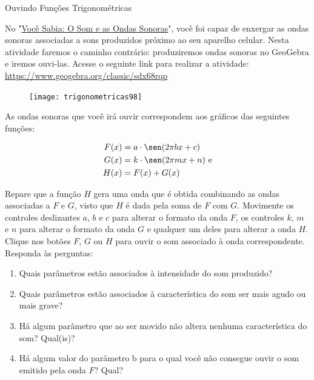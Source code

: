 \clearpage
\begin{task}{Ouvindo Funções Trigonométricas}
\label{trig-ativ20}

No "\hyperref[trig-knowledge1]{Você Sabia: O Som e as Ondas Sonoras}"{},
você foi capaz de enxergar as ondas sonoras associadas a sons produzidos próximo ao seu aparelho celular. Nesta atividade faremos o caminho contrário: produziremos ondas sonoras no GeoGebra e iremos ouvi-las. Acesse o seguinte link para realizar a atividade: \url{https://www.geogebra.org/classic/sdx68rqp}

\begin{figure}[H]
\centering

\texttt{[image: trigonometricas98]}
\end{figure}

As ondas sonoras que você irá ouvir correspondem aos gráficos das seguintes funções:

\begin{align*}
F(x) &= a\cdot\sen(2\pi bx+c)\\
G(x) &= k\cdot\sen(2\pi mx+n) \text{ e}\\
H(x) &= F(x) + G(x)
\end{align*}

Repare que a função $H$ gera uma onda que é obtida combinando as ondas associadas a $F$ e $G$, visto que $H$ é dada pela soma de $F$ com $G$. Movimente os controles deslizantes $a$, $b$ e $c$ para alterar o formato da onda $F$, os controles $k$, $m$ e $n$ para alterar o formato da onda $G$ e qualquer um deles para alterar a onda $H$. Clique nos botões $F$, $G$ ou $H$ para ouvir o som associado à onda correspondente. Responda às perguntas:

\begin{enumerate}
\item Quais parâmetros estão associados à intensidade do som produzido?
\item Quais parâmetros estão associados à característica do som ser mais agudo ou mais grave?
\item Há algum parâmetro que ao ser movido não altera nenhuma característica do som? Qual(is)?
\item Há algum valor do parâmetro b para o qual você não consegue ouvir o som emitido pela onda $F$? Qual?
\end{enumerate}
\end{task}

